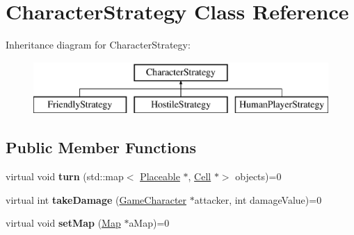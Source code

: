 \hypertarget{class_character_strategy}{}\section{Character\+Strategy Class Reference}
\label{class_character_strategy}
Inheritance diagram for Character\+Strategy\+:\begin{figure}[H]
\begin{center}
\leavevmode
\includegraphics[height=2.000000cm]{class_character_strategy}
\end{center}
\end{figure}
\subsection*{Public Member Functions}
\begin{DoxyCompactItemize}
\item 
\hypertarget{class_character_strategy_a3495998eefdbd37fc0e49a506a3f1fef}{}\label{class_character_strategy_a3495998eefdbd37fc0e49a506a3f1fef} 
virtual void {\bfseries turn} (std\+::map$<$ \hyperlink{class_placeable}{Placeable} $\ast$, \hyperlink{class_cell}{Cell} $\ast$$>$ objects)=0
\item 
\hypertarget{class_character_strategy_a4fb112f3dba0cae297a6928b4cc44392}{}\label{class_character_strategy_a4fb112f3dba0cae297a6928b4cc44392} 
virtual int {\bfseries take\+Damage} (\hyperlink{class_game_character}{Game\+Character} $\ast$attacker, int damage\+Value)=0
\item 
\hypertarget{class_character_strategy_ad5c6878cf55a2348f99342780af704c9}{}\label{class_character_strategy_ad5c6878cf55a2348f99342780af704c9} 
virtual void {\bfseries set\+Map} (\hyperlink{class_map}{Map} $\ast$a\+Map)=0
\end{DoxyCompactItemize}
